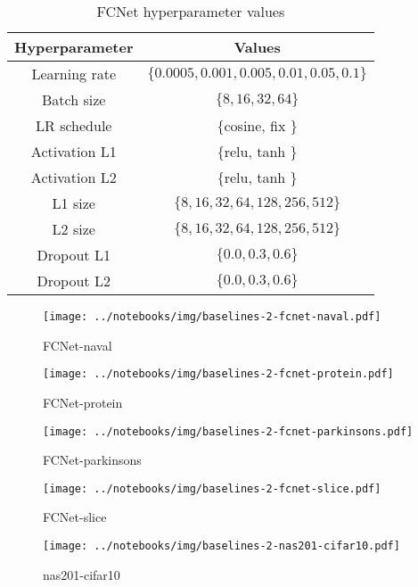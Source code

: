 \begin{table}
    \centering
\begin{tabular}{cc}
    \textbf{Hyperparameter} & \textbf{Values} \\ \midrule
    Learning rate & $\{0.0005, 0.001, 0.005, 0.01, 0.05, 0.1\}$ \\
    Batch size & $\{8, 16, 32, 64\}$ \\
    LR schedule & $\{$cosine, fix $\}$ \\
    Activation L1 & $\{$relu, tanh $\}$ \\
    Activation L2 & $\{$relu, tanh $\}$ \\
    L1 size & $\{8, 16, 32, 64, 128, 256, 512\}$ \\
    L2 size & $\{8, 16, 32, 64, 128, 256, 512\}$ \\
    Dropout L1 & $\{0.0, 0.3, 0.6\}$ \\
    Dropout L2 & $\{0.0, 0.3, 0.6\}$
    \end{tabular}
    \caption{FCNet hyperparameter values}
    \label{tab:fcnet}
\end{table}


\begin{figure}[H]
    \centering
    \texttt{[image: ../notebooks/img/baselines-2-fcnet-naval.pdf]}
    \caption{FCNet-naval}
\end{figure}

\begin{figure}[H]
    \centering
    \texttt{[image: ../notebooks/img/baselines-2-fcnet-protein.pdf]}
    \caption{FCNet-protein}
\end{figure}


\begin{figure}[H]
    \centering
    \texttt{[image: ../notebooks/img/baselines-2-fcnet-parkinsons.pdf]}
    \caption{FCNet-parkinsons}
\end{figure}

\begin{figure}[H]
    \centering
    \texttt{[image: ../notebooks/img/baselines-2-fcnet-slice.pdf]}
    \caption{FCNet-slice}
\end{figure}




\begin{figure}[H]
    \centering
    \texttt{[image: ../notebooks/img/baselines-2-nas201-cifar10.pdf]}
    \caption{nas201-cifar10}
\end{figure}


